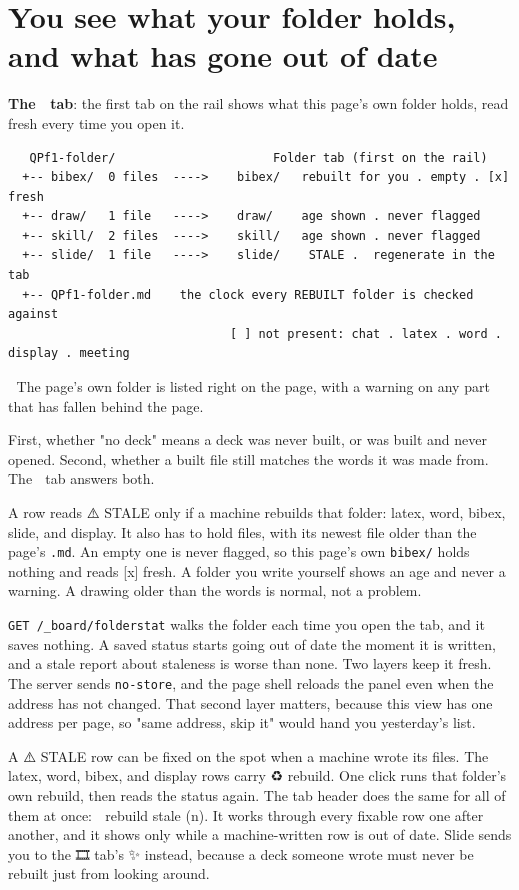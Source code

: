 
\section{You see what your folder holds, and what has gone out of date}
\textbf{The 📂 tab}: the first tab on the rail shows what this page's own folder holds, read fresh every time you open it.

\begin{verbatim}
   QPf1-folder/                      Folder tab (first on the rail)
  +-- bibex/  0 files  ---->    bibex/   rebuilt for you . empty . [x] fresh
  +-- draw/   1 file   ---->    draw/    age shown . never flagged
  +-- skill/  2 files  ---->    skill/   age shown . never flagged
  +-- slide/  1 file   ---->    slide/    STALE .  regenerate in the  tab
  +-- QPf1-folder.md    the clock every REBUILT folder is checked against
                               [ ] not present: chat . latex . word . display . meeting
\end{verbatim}
📌 The page's own folder is listed right on the page, with a warning on any part that has fallen behind the page.

First, whether "no deck" means a deck was never built, or was built and never opened. Second, whether a built file still matches the words it was made from. The 📂 tab answers both.

A row reads ⚠️ STALE only if a machine rebuilds that folder: latex, word, bibex, slide, and display. It also has to hold files, with its newest file older than the page's \texttt{.md}. An empty one is never flagged, so this page's own \texttt{bibex/} holds nothing and reads [x] fresh. A folder you write yourself shows an age and never a warning. A drawing older than the words is normal, not a problem.

\texttt{GET /\_board/folderstat} walks the folder each time you open the tab, and it saves nothing. A saved status starts going out of date the moment it is written, and a stale report about staleness is worse than none. Two layers keep it fresh. The server sends \texttt{no-store}, and the page shell reloads the panel even when the address has not changed. That second layer matters, because this view has one address per page, so "same address, skip it" would hand you yesterday's list.

A ⚠️ STALE row can be fixed on the spot when a machine wrote its files. The latex, word, bibex, and display rows carry ♻ rebuild. One click runs that folder's own rebuild, then reads the status again. The tab header does the same for all of them at once: 🔄 rebuild stale (n). It works through every fixable row one after another, and it shows only while a machine-written row is out of date. Slide sends you to the 🎞 tab's ✨ instead, because a deck someone wrote must never be rebuilt just from looking around.


